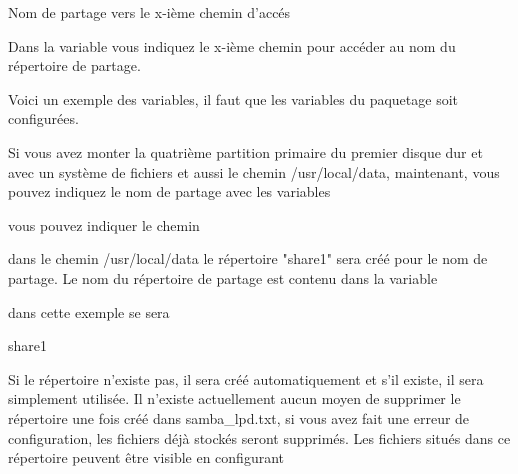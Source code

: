 \begin{description}

     Nom de partage vers le x-ième chemin d'accés

        Dans la variable  vous indiquez le x-ième
        chemin pour accéder au nom du répertoire de partage.

        Voici un exemple des variables, il faut que les variables du
        paquetage  soit configurées.







        Si vous avez monter la quatrième partition primaire du premier disque dur
        et avec un système de fichiers et aussi le chemin /usr/local/data,
        maintenant, vous pouvez indiquez le nom de partage avec les variables





        vous pouvez indiquer le chemin


        dans le chemin /usr/local/data le répertoire "share1" sera créé pour
        le nom de partage. Le nom du répertoire de partage est contenu dans
        la variable


        dans cette exemple se sera

        share1

        Si le répertoire n'existe pas, il sera créé automatiquement et s'il
        existe, il sera simplement utilisée. Il n'existe actuellement aucun
        moyen de supprimer le répertoire une fois créé dans samba\_lpd.txt,
        si vous avez fait une erreur de configuration, les fichiers déjà stockés
        seront supprimés. Les fichiers situés dans ce répertoire peuvent être
        visible en configurant


\end{description}
